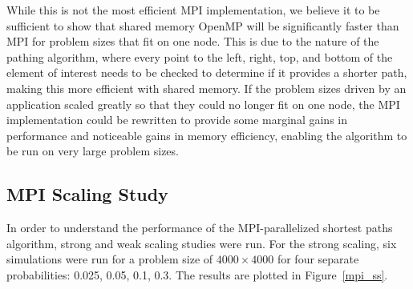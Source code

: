 \documentclass[11pt]{article}
\begin{document}
\noindent While this is not the most efficient MPI implementation, we believe it to be sufficient to show that shared memory OpenMP will be significantly faster than MPI for problem sizes that fit on one node. This is due to the nature of the pathing algorithm, where every point to the left, right, top, and bottom of the element of interest needs to be checked to determine if it provides a shorter path, making this more efficient with shared memory. If the problem sizes driven by an application scaled greatly so that they could no longer fit on one node, the MPI implementation could be rewritten to provide some marginal gains in performance and noticeable gains in memory efficiency, enabling the algorithm to be run on very large problem sizes. \\


\subsection{MPI Scaling Study}
In order to understand the performance of the MPI-parallelized shortest paths algorithm, strong and weak scaling studies were run. For the strong scaling, six simulations were run for a problem size of $4000 \times 4000$ for four separate probabilities: 0.025, 0.05, 0.1, 0.3. The results are plotted in Figure~\ref{mpi_ss}.
\end{document}
